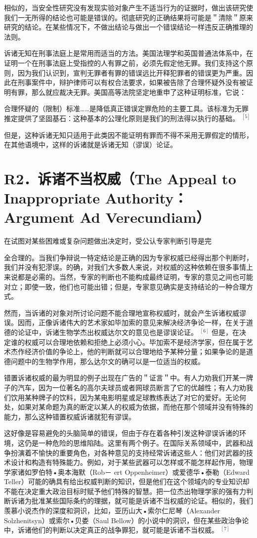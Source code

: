 相似的，当安全性研究没有发现实验对象产生不适当行为的证据时，做出该研究使我们一无所得的结论也可能是错误的。彻底研究的正确结果将可能是＂清除＂原来研究的结论。在某些情况下，不做出结论与做出一个错误结论一样违反正确推理的法则。

诉诸无知在刑事法庭上是常用而适当的方法。美国法理学和英国普通法体系中，在证明一个在刑事法庭上受指控的人有罪之前，必须先假定他无罪。我们支持这个原则，因为我们认识到，宣判无罪者有罪的错误远比开释犯罪者的错误更为严重。因此在刑事案件中，辩护律师可以有权合法要求，如果被告除了合理怀疑外没有被证明有罪，那么就应裁决无罪。美国高等法院坚定地重申了这种证明标准，它说：

合理怀疑的（限制）标准……是降低真正错误定罪危险的主要工具。该标准为无罪推定提供了坚固基石：这种基本的公理化原则是我们的刑法得以执行的基础。 ${ }^{[5]}$

但是，这种诉诸无知只适用于此类因不能证明有罪而不得不采用无罪假定的情形，在其他语境中，这样的诉诸就是诉诸无知（谬误）论证。

\section*{R2．诉诸不当权威（The Appeal to Inappropriate Authority：Argument Ad Verecundiam）}
在试图对某些困难或复杂问题做出决定时，受公认专家判断引导是完

全合理的。当我们争辩说一特定结论是正确的因为专家权威已经得出那个判断时，我们并没有犯漻误。的确，对我们大多数人来说，对权威的这种依赖在很多事情上来说都是必需的。当然，专家的判断也不能构成最终证明，专家的意见之间也可能对立；即使一致，他们也可能出错；但是，专家意见确实是支持结论的一种合理方式。

然而，当诉诸的对象对所讨论问题不能合理地宣称权威时，就会产生诉诸权威谬误。因而，正像诉诸伟大的艺术家如毕加索的意见来解决经济争论一样，在关于道德的论证中，诉诸生物学杰出权威达尔文的意见也是谬误论证。 ${ }^{[6]}$ 但是，在决定谁的权威可以合理地依赖和拒绝上必须小心。毕加索不是经济学家，但在属于艺术杰作经济价值的争论上，他的判断就可以合理地给予某种分量；如果争论的是道德问题中的生物学作用，那么达尔文的确可以是一位适当的权威。

错置诉诸权威的最为明显的例子出现在广告的＂证言＂中。有人力劝我们开某一牌子的汽车，因为一位著名的高尔夫球员或者网球员断言了它的优越性；有人力劝我们饮用某种牌子的饮料，因为某电影明星或足球教练表达了对它的爱好。无论何处，如果对某命题为真的断定以某人的权威为依据，而他在那个领域并没有特殊的能力，那么这种错置权威诉诸就犯有谬误。

这好像是容易避免的头脑简单的错误，但由于存在着各种引发这种谬误诉诸的环境，这仍是一种危险的思维陷陆。这里有两个例子。在国际关系领域中，武器和战争扮演着不愉快的重要角色，对各种意见的支持经常诉诸这些人：他们对武器的技术设计和构造有特殊能力。例如，对于某些武器可以怎样或不能怎样起作用，物理学家诸如罗伯特•奥本海默（Rob－ ert Oppenheimer）或爱德华•泰勒（Edward Teller）可能的确具有给出权威判断的知识，但是他们在这个领域内的专业知识却不能在决定重大政治目标时赋予他们特殊的智慧。把一位杰出物理学家的强有力判断诉诸为批准某些国际条约的理据，就可能是诉诸不当权威的论证。相似的，我们羡慕小说杰作的深度和洞识，比如，亚历山大•索尔仁尼琴（Alexander Solzhenitsyn）或索尔•贝娄（Saul Bellow）的小说中的洞识，但在某些政治争论中，诉诸他们的判断以决定真正的战争罪犯，就可能是诉诸不当权威。 ${ }^{[7]}$

